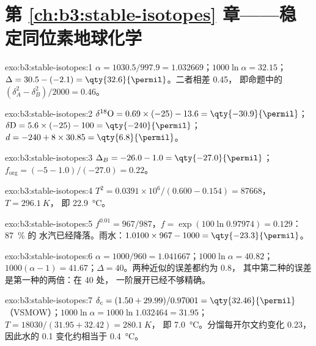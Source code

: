 \section*{第 \ref{ch:b3:stable-isotopes} 章——稳定同位素地球化学}

\begin{solution}{exo:b3:stable-isotopes:1}
$\alpha = 1030.5/997.9 = 1.032669$；$1000\ln\alpha = 32.15$；$\Delta = 30.5 -
(-2.1) = \qty{32.6}{\permil}$。二者相差 \qty{0.45}{\permil}，
即命题中的 $(\delta_A^2 - \delta_B^2)/2000 = 0.46$。
\end{solution}

\begin{solution}{exo:b3:stable-isotopes:2}
$\delta^{18}\mathrm O = 0.69\times(-25) - 13.6 = \qty{-30.9}{\permil}$；
$\delta\mathrm D = 5.6\times(-25) - 100 = \qty{-240}{\permil}$；$d = -240 +
8\times30.85 = \qty{6.8}{\permil}$。
\end{solution}

\begin{solution}{exo:b3:stable-isotopes:3}
$\Delta_B = -26.0 - 1.0 = \qty{-27.0}{\permil}$；$f_{\mathrm{org}} = (-5 -
1.0)/(-27.0) = 0.22$。
\end{solution}

\begin{solution}{exo:b3:stable-isotopes:4}
$T^2 = 0.0391\times10^6/(0.600 - 0.154) = \num{87668}$，$T = \qty{296.1}{K}$，
即 \qty{22.9}{\celsius}。
\end{solution}

\begin{solution}{exo:b3:stable-isotopes:5}
$f^{0.01} = 967/987$，$f = \exp(100\ln0.97974) = 0.129$：\qty{87}{\percent} 的
水汽已经降落。雨水：$1.0100\times967 - 1000 =
\qty{-23.3}{\permil}$。
\end{solution}

\begin{solution}{exo:b3:stable-isotopes:6}
$\alpha = 1000/960 = 1.041667$；$1000\ln\alpha = 40.82$；$1000(\alpha - 1) =
41.67$；$\Delta = 40$。两种近似的误差都约为 \qty{0.8}{\permil}，
其中第二种的误差是第一种的两倍：在 \qty{40}{\permil} 处，
一阶展开已经不够精确。
\end{solution}

\begin{solution}{exo:b3:stable-isotopes:7}
$\delta_c = (1.50 + 29.99)/0.97001 = \qty{32.46}{\permil}$（VSMOW）；$1000\ln\alpha
= 1000\ln1.032464 = 31.95$；$T = 18030/(31.95 + 32.42) = \qty{280.1}{K}$，
即 \qty{7.0}{\celsius}。分馏每开尔文约变化 \qty{0.23}{\permil}，
因此水的 \qty{0.1}{\permil} 变化约相当于 \qty{0.4}{\celsius}。
\end{solution}


